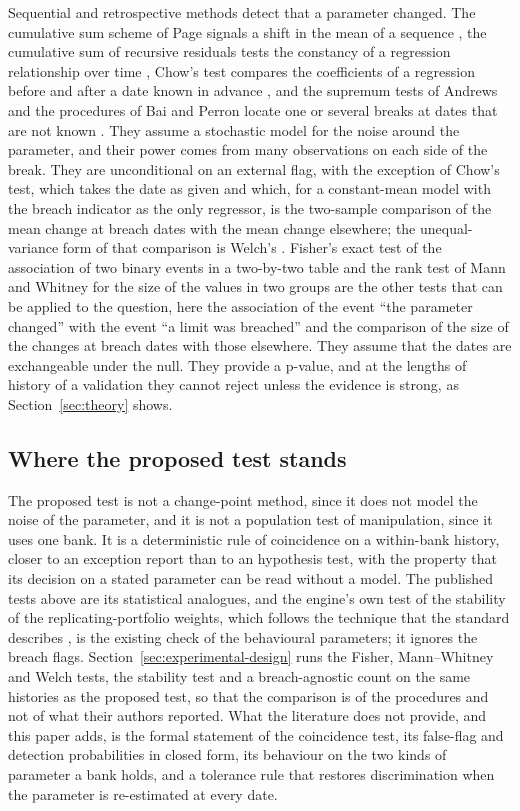 Sequential and retrospective methods detect that a parameter changed. The cumulative sum scheme of Page signals a shift in the mean of a sequence \citep{page1954}, the cumulative sum of recursive residuals tests the constancy of a regression relationship over time \citep{brown1975}, Chow's test compares the coefficients of a regression before and after a date known in advance \citep{chow1960}, and the supremum tests of Andrews and the procedures of Bai and Perron locate one or several breaks at dates that are not known \citep{andrews1993,bai1998}. They assume a stochastic model for the noise around the parameter, and their power comes from many observations on each side of the break. They are unconditional on an external flag, with the exception of Chow's test, which takes the date as given and which, for a constant-mean model with the breach indicator as the only regressor, is the two-sample comparison of the mean change at breach dates with the mean change elsewhere; the unequal-variance form of that comparison is Welch's \citep{welch1947}. Fisher's exact test of the association of two binary events in a two-by-two table \citep{fisher1935} and the rank test of Mann and Whitney for the size of the values in two groups \citep{mann1947} are the other tests that can be applied to the question, here the association of the event ``the parameter changed'' with the event ``a limit was breached'' and the comparison of the size of the changes at breach dates with those elsewhere. They assume that the dates are exchangeable under the null. They provide a p-value, and at the lengths of history of a validation they cannot reject unless the evidence is strong, as Section~\ref{sec:theory} shows.

\subsection{Where the proposed test stands}
\label{sec:rw-position}

The proposed test is not a change-point method, since it does not model the noise of the parameter, and it is not a population test of manipulation, since it uses one bank. It is a deterministic rule of coincidence on a within-bank history, closer to an exception report than to an hypothesis test, with the property that its decision on a stated parameter can be read without a model. The published tests above are its statistical analogues, and the engine's own test of the stability of the replicating-portfolio weights, which follows the technique that the standard describes \citep{bcbs2016}, is the existing check of the behavioural parameters; it ignores the breach flags. Section~\ref{sec:experimental-design} runs the Fisher, Mann--Whitney and Welch tests, the stability test and a breach-agnostic count on the same histories as the proposed test, so that the comparison is of the procedures and not of what their authors reported. What the literature does not provide, and this paper adds, is the formal statement of the coincidence test, its false-flag and detection probabilities in closed form, its behaviour on the two kinds of parameter a bank holds, and a tolerance rule that restores discrimination when the parameter is re-estimated at every date.
